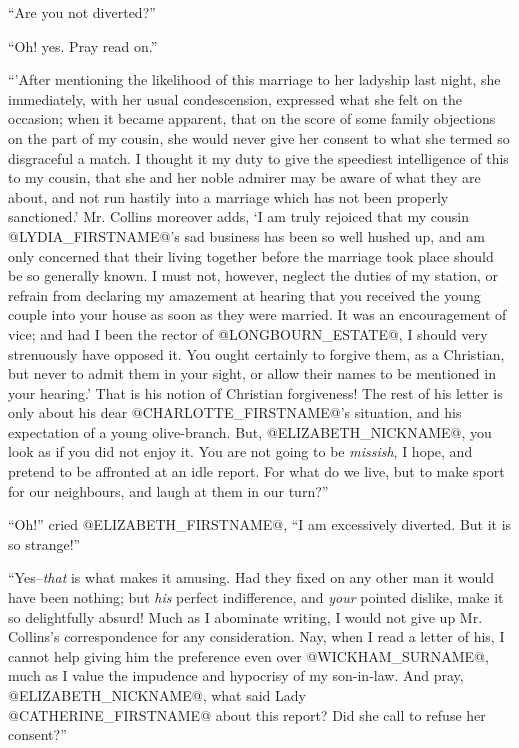 ``Are you not diverted?''

``Oh! yes. Pray read on.''

``'After mentioning the likelihood of this marriage to her ladyship last
night, she immediately, with her usual condescension, expressed what she
felt on the occasion; when it became apparent, that on the score of some
family objections on the part of my cousin, she would never give her
consent to what she termed so disgraceful a match. I thought it my duty
to give the speediest intelligence of this to my cousin, that she and
her noble admirer may be aware of what they are about, and not run
hastily into a marriage which has not been properly sanctioned.' Mr.
Collins moreover adds, `I am truly rejoiced that my cousin @LYDIA_FIRSTNAME@'s sad
business has been so well hushed up, and am only concerned that their
living together before the marriage took place should be so generally
known. I must not, however, neglect the duties of my station, or refrain
from declaring my amazement at hearing that you received the young
couple into your house as soon as they were married. It was an
encouragement of vice; and had I been the rector of @LONGBOURN_ESTATE@, I should
very strenuously have opposed it. You ought certainly to forgive them,
as a Christian, but never to admit them in your sight, or allow their
names to be mentioned in your hearing.' That is his notion of Christian
forgiveness! The rest of his letter is only about his dear @CHARLOTTE_FIRSTNAME@'s
situation, and his expectation of a young olive-branch. But, @ELIZABETH_NICKNAME@, you
look as if you did not enjoy it. You are not going to be \textit{missish},
I hope, and pretend to be affronted at an idle report. For what do we
live, but to make sport for our neighbours, and laugh at them in our
turn?''

``Oh!'' cried @ELIZABETH_FIRSTNAME@, ``I am excessively diverted. But it is so
strange!''

``Yes--\textit{that} is what makes it amusing. Had they fixed on any other man
it would have been nothing; but \textit{his} perfect indifference, and \textit{your}
pointed dislike, make it so delightfully absurd! Much as I abominate
writing, I would not give up Mr. Collins's correspondence for any
consideration. Nay, when I read a letter of his, I cannot help giving
him the preference even over @WICKHAM_SURNAME@, much as I value the impudence and
hypocrisy of my son-in-law. And pray, @ELIZABETH_NICKNAME@, what said Lady @CATHERINE_FIRSTNAME@
about this report? Did she call to refuse her consent?''

